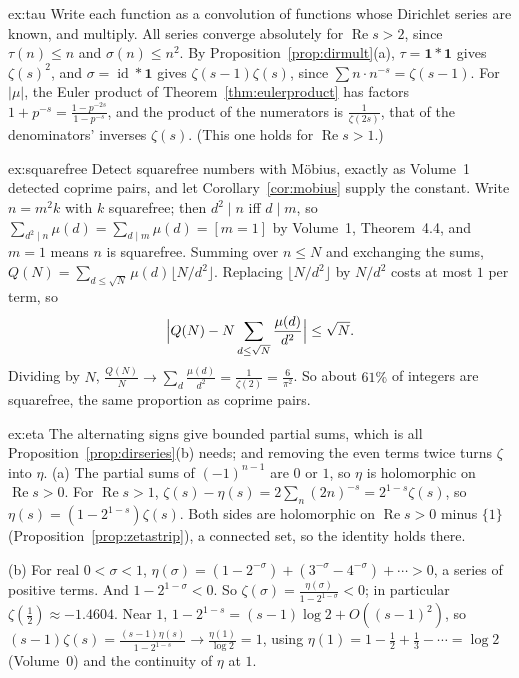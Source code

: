 \begin{solution}{ex:tau}
\idea Write each function as a convolution of functions whose Dirichlet series are known, and multiply.
\writeup All series converge absolutely for $\operatorname{Re}s>2$, since $\tau(n)\le n$ and $\sigma(n)\le n^2$. By Proposition~\ref{prop:dirmult}(a), $\tau=\mathbf 1*\mathbf 1$ gives $\zeta(s)^2$, and
$\sigma=\operatorname{id}*\mathbf 1$ gives $\zeta(s-1)\zeta(s)$, since $\sum n\cdot n^{-s}=\zeta(s-1)$. For $|\mu|$, the Euler product of Theorem~\ref{thm:eulerproduct} has factors $1+p^{-s}=\frac{1-p^{-2s}}{1-p^{-s}}$,
and the product of the numerators is $\frac1{\zeta(2s)}$, that of the denominators' inverses $\zeta(s)$. (This one holds for $\operatorname{Re}s>1$.)
\end{solution}

\begin{solution}{ex:squarefree}
\idea Detect squarefree numbers with M\"obius, exactly as Volume~1 detected coprime pairs, and let Corollary~\ref{cor:mobius} supply the constant.
\writeup Write $n=m^2k$ with $k$ squarefree; then $d^2\mid n$ iff $d\mid m$, so $\sum_{d^2\mid n}\mu(d)=\sum_{d\mid m}\mu(d)=[m=1]$ by Volume~1, Theorem~4.4, and $m=1$ means $n$ is squarefree.
Summing over $n\le N$ and exchanging the sums, $Q(N)=\sum_{d\le\sqrt N}\mu(d)\lfloor N/d^2\rfloor$. Replacing $\lfloor N/d^2\rfloor$ by $N/d^2$ costs at most $1$ per term, so
\[
\Bigl|Q(N)-N\sum_{d\le\sqrt N}\frac{\mu(d)}{d^2}\Bigr|\le\sqrt N.
\]
Dividing by $N$, $\frac{Q(N)}N\to\sum_d\frac{\mu(d)}{d^2}=\frac1{\zeta(2)}=\frac6{\pi^2}$. So about $61\%$ of integers are squarefree, the same proportion as coprime pairs.
\end{solution}

\begin{solution}{ex:eta}
\idea The alternating signs give bounded partial sums, which is all Proposition~\ref{prop:dirseries}(b) needs; and removing the even terms twice turns
$\zeta$ into $\eta$.
\writeup (a) The partial sums of $(-1)^{n-1}$ are $0$ or $1$, so $\eta$ is holomorphic on $\operatorname{Re}s>0$. For $\operatorname{Re}s>1$, $\zeta(s)-\eta(s)=2\sum_n(2n)^{-s}=2^{1-s}\zeta(s)$, so
$\eta(s)=(1-2^{1-s})\zeta(s)$. Both sides are holomorphic on $\operatorname{Re}s>0$ minus $\{1\}$ (Proposition~\ref{prop:zetastrip}), a connected set, so the identity holds there.

(b) For real $0<\sigma<1$, $\eta(\sigma)=(1-2^{-\sigma})+(3^{-\sigma}-4^{-\sigma})+\cdots>0$, a series of positive terms. And $1-2^{1-\sigma}<0$. So $\zeta(\sigma)=\frac{\eta(\sigma)}{1-2^{1-\sigma}}<0$; in
particular $\zeta(\frac12)\approx-1.4604$. Near $1$, $1-2^{1-s}=(s-1)\log2+O((s-1)^2)$, so $(s-1)\zeta(s)=\frac{(s-1)\eta(s)}{1-2^{1-s}}\to\frac{\eta(1)}{\log2}=1$, using
$\eta(1)=1-\frac12+\frac13-\cdots=\log2$ (Volume~0) and the continuity of $\eta$ at $1$.
\end{solution}

